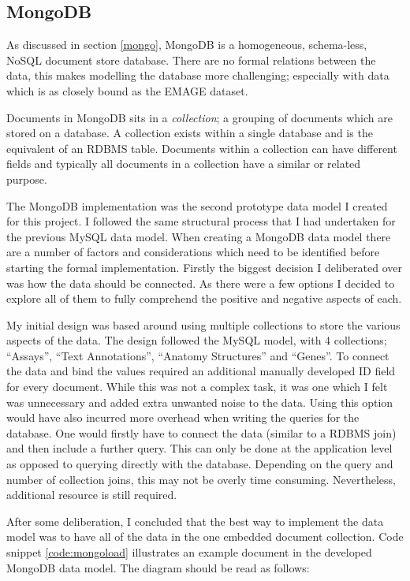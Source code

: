 \subsection{MongoDB}\label{mongodesign}

As discussed in section \ref{mongo}, MongoDB is a homogeneous, schema-less, NoSQL document store database. There are no formal relations between the data, this makes modelling the database more challenging; especially with data which is as closely bound as the EMAGE dataset.

Documents in MongoDB sits in a \textit{collection}; a grouping of documents which are stored on a database. A collection exists within a single database and is the equivalent of an RDBMS table. Documents within a collection can have different fields and typically all documents in a collection have a similar or related purpose. 

The MongoDB implementation was the second prototype data model I created for this project. I followed the same structural process that I had undertaken for the previous MySQL data model. When creating a MongoDB data model there are a number of factors and considerations which need to be identified before starting the formal implementation. Firstly the biggest decision I deliberated over was how the data should be connected. As there were a few options I decided to explore all of them to fully comprehend the positive and negative aspects of each.

My initial design was based around using multiple collections to store the various aspects of the data. The design followed the MySQL model, with 4 collections; ``Assays'', ``Text Annotations'', ``Anatomy Structures'' and ``Genes''. To connect the data and bind the values required an additional manually developed ID field for every document. While this was not a complex task, it was one which I felt was unnecessary and added extra unwanted noise to the data. Using this option would have also incurred more overhead when writing the queries for the database. One would firstly have to connect the data (similar to a RDBMS join) and then include a further query. This can only be done at the application level as opposed to querying directly with the database. Depending on the query and number of collection joins, this may not be overly time consuming. Nevertheless, additional resource is still required. 

After some deliberation, I concluded that the best way to implement the data model was to have all of the data in the one embedded document collection. Code snippet \ref{code:mongoload} illustrates an example document in the developed MongoDB data model. The diagram should be read as follows:

